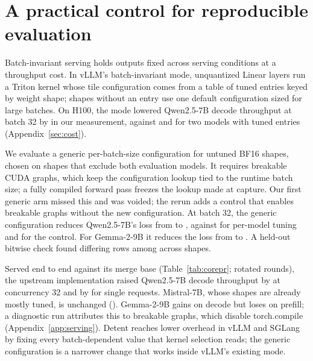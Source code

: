 \section{A practical control for reproducible evaluation}\label{sec:generic}
Batch-invariant serving holds outputs fixed across serving conditions at a throughput cost. In vLLM's batch-invariant mode, unquantized Linear layers run a Triton kernel whose tile configuration comes from a table of tuned entries keyed by weight shape; shapes without an entry use one default configuration sized for large batches. On H100, the mode lowered Qwen2.5-7B decode throughput at batch 32 by \GenericStockB{} in our measurement, against \LlamaStock{} and \QthreeStock{} for two models with tuned entries (Appendix~\ref{sec:cost}).

We evaluate a generic per-batch-size configuration for untuned BF16 shapes, chosen on shapes that exclude both evaluation models. It requires breakable CUDA graphs, which keep the configuration lookup tied to the runtime batch size; a fully compiled forward pass freezes the lookup made at capture. Our first generic arm missed this and was voided; the rerun adds a control that enables breakable graphs without the new configuration. At batch 32, the generic configuration reduces Qwen2.5-7B's loss from \GenericStockB{} to \GenDefaultLossBatchThirtyTwo{}, against \GenTunedLossBatchThirtyTwo{} for per-model tuning and \GenericOnbreakB{} for the control. For Gemma-2-9B it reduces the loss from \GenericGemmaStockB{} to \GenericGemmaB{}. A held-out bitwise check found \GenericCheckBad{} differing rows among \GenericCheckRows{} across \GenericTestShapes{} shapes.

Served end to end against its merge base (Table~\ref{tab:corepr}; \CoreRounds{} rotated rounds), the upstream implementation \citep{vllm67376} raised Qwen2.5-7B decode throughput by \CoreQsevenDec{} at concurrency 32 and by \CoreQsevenDecOne{} for single requests. Mistral-7B, whose shapes are already mostly tuned, is unchanged (\CoreMistralDec{}). Gemma-2-9B gains on decode but loses \CoreGemmaPreLoss{} on prefill; a diagnostic run attributes this to breakable graphs, which disable torch.compile (Appendix~\ref{app:serving}). Detent \citep{xin2026detent} reaches lower overhead in vLLM and SGLang by fixing every batch-dependent value that kernel selection reads; the generic configuration is a narrower change that works inside vLLM's existing mode.

\begin{table}[t]
\centering\small

\caption{Upstream change adding the generic configuration against its merge base, batch-invariant mode on: median of \CoreRounds{} paired per-round throughput ratios (output tokens for decode, requests for prefill), with the number of rounds the change was faster. c32 and c1: maximum concurrency 32 and 1.}\label{tab:corepr}
\end{table}

